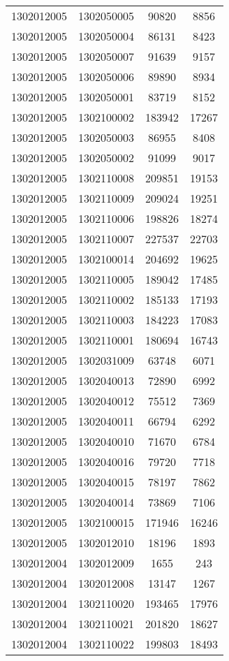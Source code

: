 \begin{longtable}{llcc}
1302012005 & 1302050005 & 90820 & 8856\\
1302012005 & 1302050004 & 86131 & 8423\\
1302012005 & 1302050007 & 91639 & 9157\\
1302012005 & 1302050006 & 89890 & 8934\\
1302012005 & 1302050001 & 83719 & 8152\\
1302012005 & 1302100002 & 183942 & 17267\\
1302012005 & 1302050003 & 86955 & 8408\\
1302012005 & 1302050002 & 91099 & 9017\\
1302012005 & 1302110008 & 209851 & 19153\\
1302012005 & 1302110009 & 209024 & 19251\\
1302012005 & 1302110006 & 198826 & 18274\\
1302012005 & 1302110007 & 227537 & 22703\\
1302012005 & 1302100014 & 204692 & 19625\\
1302012005 & 1302110005 & 189042 & 17485\\
1302012005 & 1302110002 & 185133 & 17193\\
1302012005 & 1302110003 & 184223 & 17083\\
1302012005 & 1302110001 & 180694 & 16743\\
1302012005 & 1302031009 & 63748 & 6071\\
1302012005 & 1302040013 & 72890 & 6992\\
1302012005 & 1302040012 & 75512 & 7369\\
1302012005 & 1302040011 & 66794 & 6292\\
1302012005 & 1302040010 & 71670 & 6784\\
1302012005 & 1302040016 & 79720 & 7718\\
1302012005 & 1302040015 & 78197 & 7862\\
1302012005 & 1302040014 & 73869 & 7106\\
1302012005 & 1302100015 & 171946 & 16246\\
1302012005 & 1302012010 & 18196 & 1893\\
1302012004 & 1302012009 & 1655 & 243\\
1302012004 & 1302012008 & 13147 & 1267\\
1302012004 & 1302110020 & 193465 & 17976\\
1302012004 & 1302110021 & 201820 & 18627\\
1302012004 & 1302110022 & 199803 & 18493\\

\end{longtable}
